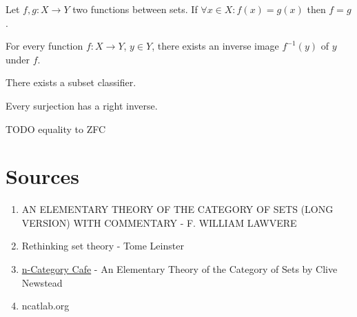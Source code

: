 \begin{appendix}
\begin{axiom}
Let $f,g: X \longrightarrow Y$ two functions between sets. If $\forall x \in X: f(x) = g(x)$ then $f = g$.
\end{axiom}

\begin{axiom}
For every function $f: X \longrightarrow Y$, $y \in Y$, there exists an inverse image $f^{-1}(y)$ of $y$ under $f$.
\end{axiom}

\begin{axiom}
There exists a subset classifier.
\end{axiom}

\begin{axiom}
Every surjection has a right inverse.
\end{axiom}

\begin{axiom}
TODO equality to ZFC
\end{axiom}

\section{Sources}

\begin{enumerate}
\item AN ELEMENTARY THEORY
OF THE CATEGORY OF SETS (LONG VERSION)
WITH COMMENTARY - F. WILLIAM LAWVERE
\item Rethinking set theory - Tome Leinster
\item \href{https://golem.ph.utexas.edu/category/2014/01/an_elementary_theory_of_the_ca.html}{n-Category Cafe} - An Elementary Theory of the Category of Sets by Clive Newstead
\item ncatlab.org
\end{enumerate}

\end{appendix}


